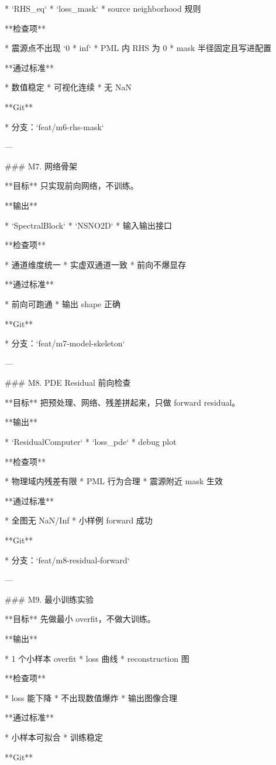 * `RHS_eq`
* `loss_mask`
* source neighborhood 规则

**检查项**

* 震源点不出现 `0 * inf`
* PML 内 RHS 为 0
* mask 半径固定且写进配置

**通过标准**

* 数值稳定
* 可视化连续
* 无 NaN

**Git**

* 分支：`feat/m6-rhs-mask`

---

### M7. 网络骨架

**目标**
只实现前向网络，不训练。

**输出**

* `SpectralBlock`
* `NSNO2D`
* 输入输出接口

**检查项**

* 通道维度统一
* 实虚双通道一致
* 前向不爆显存

**通过标准**

* 前向可跑通
* 输出 shape 正确

**Git**

* 分支：`feat/m7-model-skeleton`

---

### M8. PDE Residual 前向检查

**目标**
把预处理、网络、残差拼起来，只做 forward residual。

**输出**

* `ResidualComputer`
* `loss_pde`
* debug plot

**检查项**

* 物理域内残差有限
* PML 行为合理
* 震源附近 mask 生效

**通过标准**

* 全图无 NaN/Inf
* 小样例 forward 成功

**Git**

* 分支：`feat/m8-residual-forward`

---

### M9. 最小训练实验

**目标**
先做最小 overfit，不做大训练。

**输出**

* 1 个小样本 overfit
* loss 曲线
* reconstruction 图

**检查项**

* loss 能下降
* 不出现数值爆炸
* 输出图像合理

**通过标准**

* 小样本可拟合
* 训练稳定

**Git**

